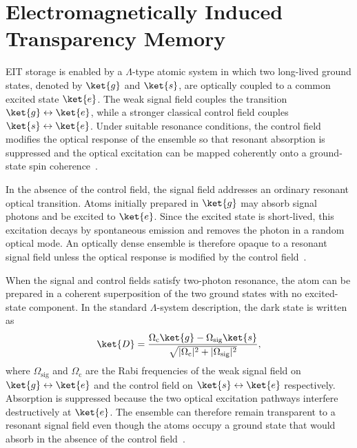 \section{Electromagnetically Induced Transparency Memory}
\label{sec:eit_memory}

EIT storage is enabled by a $\Lambda$-type atomic system in which two long-lived ground states, denoted by $\ket{g}$ and $\ket{s}$, are optically coupled to a common excited state $\ket{e}$. The weak signal field couples the transition $\ket{g}\leftrightarrow\ket{e}$, while a stronger classical control field couples $\ket{s}\leftrightarrow\ket{e}$. Under suitable resonance conditions, the control field modifies the optical response of the ensemble so that resonant absorption is suppressed and the optical excitation can be mapped coherently onto a ground-state spin coherence~\cite{Apgteitiav_FinkelsteinEtAl_2023,Psliwavueit_DeRoseEtAl_2023a,}.

In the absence of the control field, the signal field addresses an ordinary resonant optical transition. Atoms initially prepared in $\ket{g}$ may absorb signal photons and be excited to $\ket{e}$. Since the excited state is short-lived, this excitation decays by spontaneous emission and removes the photon in a random optical mode. An optically dense ensemble is therefore opaque to a resonant signal field unless the optical response is modified by the control field~\cite{Apgteitiav_FinkelsteinEtAl_2023,Psliwavueit_DeRoseEtAl_2023a}.

When the signal and control fields satisfy two-photon resonance, the atom can be prepared in a coherent superposition of the two ground states with no excited-state component. In the standard $\Lambda$-system description, the dark state is written as~\cite{Apgteitiav_FinkelsteinEtAl_2023,Psliwavueit_DeRoseEtAl_2023a}
\begin{equation}
    \ket{D}
    =
    \frac{
    \Omega_{\mathrm{c}}\ket{g}
    -
    \Omega_{\mathrm{sig}}\ket{s}
    }{
    \sqrt{|\Omega_{\mathrm{c}}|^2+|\Omega_{\mathrm{sig}}|^2}
    },
    \label{eq:eit_dark_state}
\end{equation}
where $\Omega_{\mathrm{sig}}$ and $\Omega_{\mathrm{c}}$ are the Rabi frequencies of the weak signal field on $\ket{g}\leftrightarrow\ket{e}$  and the control field on $\ket{s}\leftrightarrow\ket{e}$ respectively. Absorption is suppressed because the two optical excitation pathways interfere destructively at $\ket{e}$. The ensemble can therefore remain transparent to a resonant signal field even though the atoms occupy a ground state that would absorb in the absence of the control field~\cite{Apgteitiav_FinkelsteinEtAl_2023,Psliwavueit_DeRoseEtAl_2023a}.


